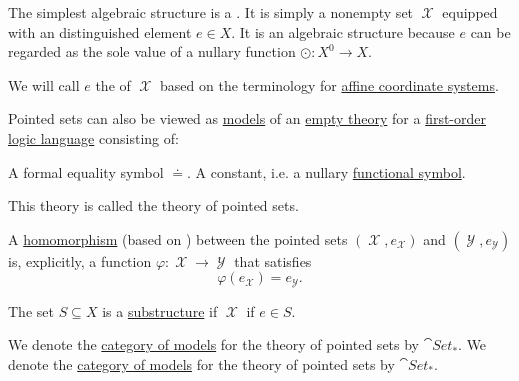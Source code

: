 \begin{definition}\label{def:pointed_set}
  The simplest algebraic structure is a . It is simply a nonempty set \( \mscrX \) equipped with an distinguished element \( e \in X \). It is an algebraic structure because \( e \) can be regarded as the sole value of a nullary function \( \odot: X^0 \to X \).

  We will call \( e \) the  of \( \mscrX \) based on the terminology for \hyperref[def:euclidean_plane_coordinate_system/origin]{affine coordinate systems}.

  \begin{thmenum}
     Pointed sets can also be viewed as \hyperref[def:first_order_semantics/satisfiability]{models} of an \hyperref[def:first_order_theory]{empty theory} for a \hyperref[def:first_order_language]{first-order logic language} consisting of:
    \begin{thmenum}
       A formal equality symbol \( \doteq \).
       A constant, i.e. a nullary \hyperref[def:first_order_language/func]{functional symbol}.
    \end{thmenum}

    This theory is called the theory of pointed sets.

     A \hyperref[def:first_order_homomorphism]{homomorphism} (based on ) between the pointed sets \( (\mscrX, e_{\mscrX}) \) and \( (\mscrY, e_{\mscrY}) \) is, explicitly, a function \( \varphi: \mscrX \to \mscrY \) that satisfies
    \begin{equation}\label{eq:def:pointed_set/homomorphism}
      \varphi(e_{\mscrX}) = e_{\mscrY}.
    \end{equation}

     The set \( S \subseteq X \) is a \hyperref[def:first_order_substructure]{substructure} if \( \mscrX \) if \( e \in S \).

     We denote the \hyperref[def:category_of_first_order_models]{category of models} for the theory of pointed sets by \( \cat{Set}_* \). We denote the \hyperref[def:category_of_first_order_models]{category of models} for the theory of pointed sets by \( \cat{Set}_* \).
  \end{thmenum}
\end{definition}
